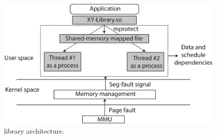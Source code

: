 
\begin{figure}[t]

\centering
      \includegraphics[scale=.35]{figure/Library-architecture}
  \caption{\projecttitle library architecture.}
   
  \label{fig:lib-architecture}

\end{figure}
